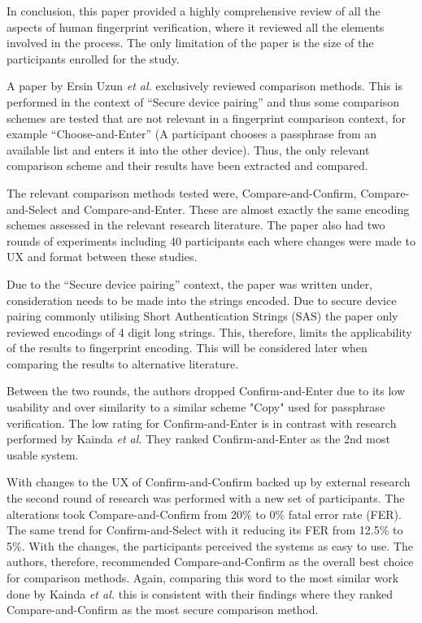 In conclusion, this paper provided a highly comprehensive review of all the aspects of human fingerprint verification, where it reviewed all the elements involved in the process. The only limitation of the paper is the size of the participants enrolled for the study.

A paper by Ersin Uzun \textit{et al.}\cite{uzun2007usability} exclusively reviewed comparison methods. This is performed in the context of ``Secure device pairing'' and thus some comparison schemes are tested that are not relevant in a fingerprint comparison context, for example  ``Choose-and-Enter'' (A participant chooses a passphrase from an available list and enters it into the other device). Thus, the only relevant comparison scheme and their results have been extracted and compared. 

The relevant comparison methods tested were, Compare-and-Confirm, Compare-and-Select and Compare-and-Enter. These are almost exactly the same encoding schemes assessed in the relevant research literature. The paper also had two rounds of experiments including 40 participants each where changes were made to UX and format between these studies.

Due to the ``Secure device pairing'' context, the paper was written under, consideration needs to be made into the strings encoded. Due to secure device pairing commonly utilising Short Authentication Strings (SAS) the paper only reviewed encodings of 4 digit long strings. This, therefore, limits the applicability of the results to fingerprint encoding. This will be considered later when comparing the results to alternative literature.

Between the two rounds, the authors dropped Confirm-and-Enter due to its low usability and over similarity to a similar scheme "Copy" used for passphrase verification. The low rating for Confirm-and-Enter is in contrast with research performed by Kainda \textit{et al.}\cite{kainda2009usability} They ranked Confirm-and-Enter as the 2nd most usable system.

With changes to the UX of Confirm-and-Confirm backed up by external research \cite{palmer1990attentional}\cite{hammer2009category} the second round of research was performed with a new set of participants. The alterations took Compare-and-Confirm from 20\% to 0\% fatal error rate (FER). The same trend for Confirm-and-Select with it reducing its FER from 12.5\% to 5\%. With the changes, the participants perceived the systems as easy to use. The authors, therefore, recommended Compare-and-Confirm as the overall best choice for comparison methods. Again, comparing this word to the most similar work done by Kainda \textit{et al.}\cite{kainda2009usability} this is consistent with their findings where they ranked Compare-and-Confirm as the most secure comparison method.

